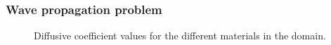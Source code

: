 \begin{frame}
\frametitle{Wave propagation problem}
\begin{figure}
  {\caption{Diffusive coefficient values for the different materials in the domain.}
  \label{fig:matHelmtresD}}
\end{figure}
\end{frame}
%
%
%
%
%
%
%
%
%
